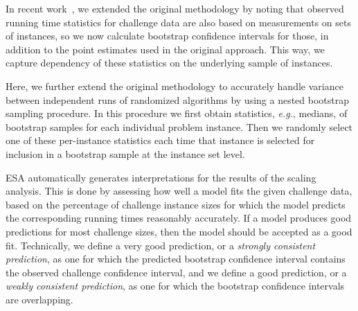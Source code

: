 \documentclass[aic]{iosart2x}
\newcommand{\eg}{\emph{e.g.}}
\begin{document}
In recent work~\cite{MuHoo15}, we extended the original methodology by noting that observed running time statistics for challenge data are also based on measurements on sets of instances, so we now calculate bootstrap confidence intervals for those, in addition to the point estimates used in the original approach. This way, we capture dependency of these statistics on the underlying sample of instances.

Here, we further extend the original methodology to accurately handle variance between independent runs of randomized algorithms by using a nested bootstrap sampling procedure. In this procedure we first obtain statistics, \eg{}, medians, of bootstrap samples for each individual problem instance. Then we randomly select one of these per-instance statistics each time that instance is selected for inclusion in a bootstrap sample at the instance set level. 


\label{sec:auto-interpretation}

ESA automatically generates interpretations for the results of the scaling analysis. This is done by assessing how well a model fits the given challenge data, based on the percentage of challenge instance sizes for which the model predicts the corresponding running times reasonably accurately. If a model produces good predictions for most challenge sizes, then the model should be accepted as a good fit. Technically, we define a very good prediction, or a \emph{strongly consistent prediction}, as one for which the predicted bootstrap confidence interval contains the observed challenge confidence interval, and we define a good prediction, or a \emph{weakly consistent prediction}, as one for which the bootstrap confidence intervals are overlapping.
\end{document}
